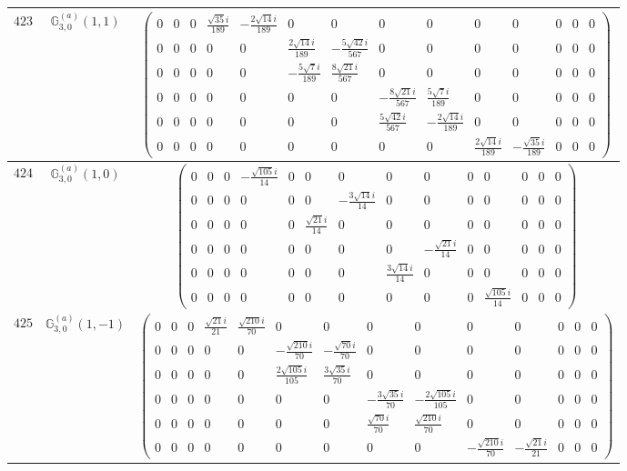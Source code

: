 \documentclass[fleqn,8pt,landscape]{jsarticle}
\begin{document}
\begin{center}
\begin{longtable}{ccc}
$ 423 $ & $ \mathbb{G}_{3,0}^{(a)}(1,1) $ & $ \begin{pmatrix} 0 & 0 & 0 & \frac{\sqrt{35} i}{189} & - \frac{2 \sqrt{14} i}{189} & 0 & 0 & 0 & 0 & 0 & 0 & 0 & 0 & 0 \\ 0 & 0 & 0 & 0 & 0 & \frac{2 \sqrt{14} i}{189} & - \frac{5 \sqrt{42} i}{567} & 0 & 0 & 0 & 0 & 0 & 0 & 0 \\ 0 & 0 & 0 & 0 & 0 & - \frac{5 \sqrt{7} i}{189} & \frac{8 \sqrt{21} i}{567} & 0 & 0 & 0 & 0 & 0 & 0 & 0 \\ 0 & 0 & 0 & 0 & 0 & 0 & 0 & - \frac{8 \sqrt{21} i}{567} & \frac{5 \sqrt{7} i}{189} & 0 & 0 & 0 & 0 & 0 \\ 0 & 0 & 0 & 0 & 0 & 0 & 0 & \frac{5 \sqrt{42} i}{567} & - \frac{2 \sqrt{14} i}{189} & 0 & 0 & 0 & 0 & 0 \\ 0 & 0 & 0 & 0 & 0 & 0 & 0 & 0 & 0 & \frac{2 \sqrt{14} i}{189} & - \frac{\sqrt{35} i}{189} & 0 & 0 & 0 \end{pmatrix} $ \\ \hline
$ 424 $ & $ \mathbb{G}_{3,0}^{(a)}(1,0) $ & $ \begin{pmatrix} 0 & 0 & 0 & - \frac{\sqrt{105} i}{14} & 0 & 0 & 0 & 0 & 0 & 0 & 0 & 0 & 0 & 0 \\ 0 & 0 & 0 & 0 & 0 & 0 & - \frac{3 \sqrt{14} i}{14} & 0 & 0 & 0 & 0 & 0 & 0 & 0 \\ 0 & 0 & 0 & 0 & 0 & \frac{\sqrt{21} i}{14} & 0 & 0 & 0 & 0 & 0 & 0 & 0 & 0 \\ 0 & 0 & 0 & 0 & 0 & 0 & 0 & 0 & - \frac{\sqrt{21} i}{14} & 0 & 0 & 0 & 0 & 0 \\ 0 & 0 & 0 & 0 & 0 & 0 & 0 & \frac{3 \sqrt{14} i}{14} & 0 & 0 & 0 & 0 & 0 & 0 \\ 0 & 0 & 0 & 0 & 0 & 0 & 0 & 0 & 0 & 0 & \frac{\sqrt{105} i}{14} & 0 & 0 & 0 \end{pmatrix} $ \\ \hline
$ 425 $ & $ \mathbb{G}_{3,0}^{(a)}(1,-1) $ & $ \begin{pmatrix} 0 & 0 & 0 & \frac{\sqrt{21} i}{21} & \frac{\sqrt{210} i}{70} & 0 & 0 & 0 & 0 & 0 & 0 & 0 & 0 & 0 \\ 0 & 0 & 0 & 0 & 0 & - \frac{\sqrt{210} i}{70} & - \frac{\sqrt{70} i}{70} & 0 & 0 & 0 & 0 & 0 & 0 & 0 \\ 0 & 0 & 0 & 0 & 0 & \frac{2 \sqrt{105} i}{105} & \frac{3 \sqrt{35} i}{70} & 0 & 0 & 0 & 0 & 0 & 0 & 0 \\ 0 & 0 & 0 & 0 & 0 & 0 & 0 & - \frac{3 \sqrt{35} i}{70} & - \frac{2 \sqrt{105} i}{105} & 0 & 0 & 0 & 0 & 0 \\ 0 & 0 & 0 & 0 & 0 & 0 & 0 & \frac{\sqrt{70} i}{70} & \frac{\sqrt{210} i}{70} & 0 & 0 & 0 & 0 & 0 \\ 0 & 0 & 0 & 0 & 0 & 0 & 0 & 0 & 0 & - \frac{\sqrt{210} i}{70} & - \frac{\sqrt{21} i}{21} & 0 & 0 & 0 \end{pmatrix} $ \\ \hline

\end{longtable}
\end{center}
\end{document}

